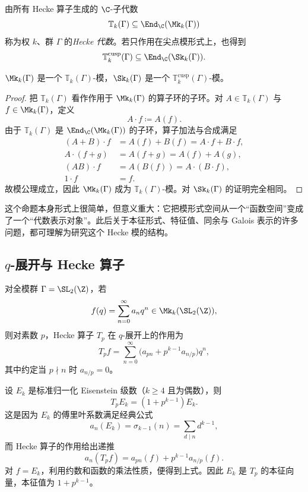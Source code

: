 \begin{definition}
由所有 Hecke 算子生成的 $\C$-子代数
\[
\mathbb T_k(\Gamma)\subseteq \End_\C(\Mk_k(\Gamma))
\]
称为权 $k$、群 $\Gamma$ 的\emph{Hecke 代数}。若只作用在尖点模形式上，也得到
\[
\mathbb T_k^{\mathrm{cusp}}(\Gamma)\subseteq \End_\C(\Sk_k(\Gamma)).
\]
\end{definition}

\begin{proposition}
$\Mk_k(\Gamma)$ 是一个 $\mathbb T_k(\Gamma)$-模，$\Sk_k(\Gamma)$ 是一个 $\mathbb T_k^{\mathrm{cusp}}(\Gamma)$-模。
\end{proposition}

\begin{proof}
把 $\mathbb T_k(\Gamma)$ 看作作用于 $\Mk_k(\Gamma)$ 的算子环的子环。对 $A\in \mathbb T_k(\Gamma)$ 与 $f\in \Mk_k(\Gamma)$，定义
\[
A\cdot f\coloneqq A(f).
\]
由于 $\mathbb T_k(\Gamma)$ 是 $\End_\C(\Mk_k(\Gamma))$ 的子环，算子加法与合成满足
\begin{align*}
(A+B)\cdot f&=A(f)+B(f)=A\cdot f+B\cdot f,\\
A\cdot (f+g)&=A(f+g)=A(f)+A(g),\\
(AB)\cdot f&=A(B(f))=A\cdot (B\cdot f),\\
1\cdot f&=f.
\end{align*}
故模公理成立，因此 $\Mk_k(\Gamma)$ 成为 $\mathbb T_k(\Gamma)$-模。对 $\Sk_k(\Gamma)$ 的证明完全相同。
\end{proof}

\begin{remark}
这个命题本身形式上很简单，但意义重大：它把模形式空间从一个“函数空间”变成了一个“代数表示对象”。此后关于本征形式、特征值、同余与 Galois 表示的许多问题，都可理解为研究这个 Hecke 模的结构。
\end{remark}

\subsection{$q$-展开与 Hecke 算子}

对全模群 $\Gamma=\SL_2(\Z)$，若
\[
f(q)=\sum_{n=0}^\infty a_n q^n\in \Mk_k(\SL_2(\Z)),
\]
则对素数 $p$，Hecke 算子 $T_p$ 在 $q$-展开上的作用为
\[
T_p f=\sum_{n=0}^\infty \bigl(a_{pn}+p^{k-1}a_{n/p}\bigr)q^n,
\]
其中约定当 $p\nmid n$ 时 $a_{n/p}=0$。

\begin{example}
设 $E_k$ 是标准归一化 Eisenstein 级数（$k\ge 4$ 且为偶数），则
\[
T_pE_k=(1+p^{k-1})E_k.
\]
这是因为 $E_k$ 的傅里叶系数满足经典公式
\[
a_n(E_k)=\sigma_{k-1}(n)=\sum_{d\mid n} d^{k-1},
\]
而 Hecke 算子的作用给出递推
\[
a_n(T_pf)=a_{pn}(f)+p^{k-1}a_{n/p}(f).
\]
对 $f=E_k$，利用约数和函数的乘法性质，便得到上式。因此 $E_k$ 是 $T_p$ 的本征向量，本征值为 $1+p^{k-1}$。
\end{example}

